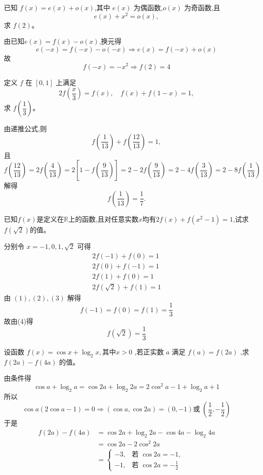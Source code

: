 \begin{questions}
    \question 已知 $f(x) = e(x) + o(x)$,其中 $e(x)$ 为偶函数,$o(x)$ 为奇函数,且
    \[
    e(x) + x^2 = o(x),
    \]
    求 $f(2)$。
    \begin{solution}
        由已知$e(x)=f(x)-o(x)$,换元得
        \[
        e(-x)=f(-x)-o(-x) \Rightarrow e(x)=f(-x)+o(x)
        \]
        故
        \[
        f(-x)=-x^2 \Rightarrow f(2)=4
        \]
    \end{solution}

    \question 定义 $f$ 在 $[0,1]$ 上满足
    \[
    2f\left(\frac{x}{3}\right) = f(x), \quad f(x) + f(1-x) = 1,
    \]
    求 $f\left(\dfrac{1}{3}\right)$。
    \begin{solution}
        由递推公式,则
        \[
        f\left(\frac{1}{13}\right) + f\left(\frac{12}{13}\right) = 1,
        \]
        且
        \[
        f\left(\frac{12}{13}\right) 
        = 2 f\left(\frac{4}{13}\right) 
        = 2 \left[1-f\left(\frac{9}{13}\right)\right]
        = 2 - 2 f\left(\frac{9}{13}\right)
        = 2 - 4 f\left(\frac{3}{13}\right)
        = 2 - 8 f\left(\frac{1}{13}\right)
        \]
        解得
        \[
        f\left(\frac{1}{13}\right) = \frac{1}{7}.
        \]
    \end{solution}

    \question 已知$f(x)$是定义在$\mathbb{R}$上的函数,且对任意实数$x$均有$2f(x)+f(x^2-1)=1$,试求$f(\sqrt{2})$的值。
    \begin{solution}
        分别令 $x=-1,0,1,\sqrt{2}$ 可得
        \begin{align*}
            2f(-1) + f(0) = 1 \tag{1}\\
            2f(0) + f(-1) = 1 \tag{2}\\
            2f(1) + f(0) = 1 \tag{3}\\
            2f(\sqrt{2}) + f(1) = 1 \tag{4}
        \end{align*}
        由 $(1),(2),(3)$ 解得
        \[
        f(-1) = f(0)= f(1)= \frac{1}{3}
        \]
        故由(4)得
        \[
        f(\sqrt{2}) = \frac{1}{3}
        \]
    \end{solution}

    \question 设函数 $f(x)=\cos x+\log_{2}x,$其中$x>0$ ,若正实数 $a$ 满足 $f(a)=f(2a)$ ,求$f(2a)-f(4a)$ 的值。
    \begin{solution}
        由条件得 $$\cos a+\log_{2}a=\cos 2a+\log_{2}2a=2\cos^{2}a-1+\log_{2}a+1$$
        所以
        $$\cos a(2\cos a-1) =0\Rightarrow (\cos a,\cos 2a) = (0,-1) \text{或}\; (\frac{1}{2},-\frac{1}{2})$$
        于是
        \begin{align*}
        f(2a) - f(4a) 
        &= \cos 2a + \log_2 2a - \cos 4a - \log_2 4a \\
        &= \cos 2a - 2 \cos^2 2a\\
        &= \begin{cases}
            -3, & \text{若 } \cos 2a = -1, \\
            -1, & \text{若 } \cos 2a = -\frac{1}{2}
        \end{cases}
        \end{align*}
    \end{solution}


\end{questions}
